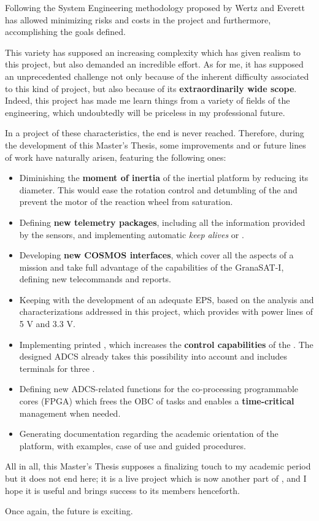 Following the System Engineering methodology proposed by Wertz and Everett \cite{smad} has allowed minimizing risks and costs in the project and furthermore, accomplishing the goals defined.

This variety has supposed an increasing complexity which has given realism to this project, but also demanded an incredible effort. As for me, it has supposed an unprecedented challenge not only because of the inherent difficulty associated to this kind of project, but also because of its \textbf{extraordinarily wide scope}. Indeed, this project has made me learn things from a variety of fields of the engineering, which undoubtedly will be priceless in my professional future.

In a project of these characteristics, the end is never reached. Therefore, during the development of this Master's Thesis, some improvements and or future lines of work have naturally arisen, featuring the following ones:


\begin{itemize} [topsep=0pt]

\item Diminishing the \textbf{moment of inertia} of the inertial platform by reducing its diameter. This would ease the rotation control and detumbling of the  and prevent the motor of the reaction wheel from saturation.

\item Defining \textbf{new telemetry packages}, including all the information provided by the sensors, and implementing automatic \textit{keep alives} or .

\item Developing \textbf{new COSMOS interfaces}, which cover all the aspects of a mission and take full advantage of the capabilities of the GranaSAT-I, defining new telecommands and reports.

\item Keeping with the development of an adequate \acrshort{EPS}, based on the analysis and characterizations addressed in this project, which provides with power lines of 5 V and 3.3 V.

\item Implementing printed , which increases the \textbf{control capabilities} of the . The designed \acrshort{ADCS} already takes this possibility into account and includes terminals for three .

\item Defining new \acrshort{ADCS}-related functions for the co-processing programmable cores (\acrshort{FPGA}) which frees the \acrshort{OBC} of tasks and enables a \textbf{time-critical} management when needed.

\item Generating documentation regarding the academic orientation of the platform, with examples, case of use and guided procedures.

\end{itemize}

All in all, this Master's Thesis supposes a finalizing touch to my academic period but it does not end here; it is a live project which is now another part of , and I hope it is useful and brings success to its members henceforth.

Once again, the future is exciting.

